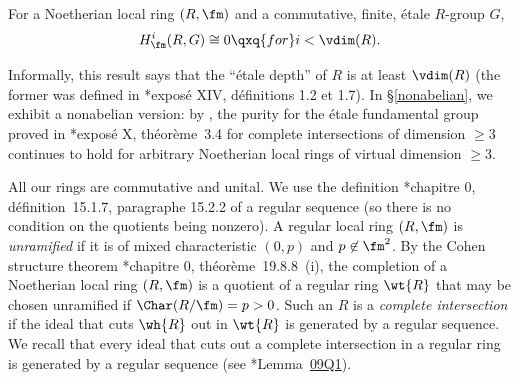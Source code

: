  \label{ell-semipurity-ann}
For a Noetherian local ring $(R, \fm)$ and a commutative, finite, \'{e}tale $R$-group $G$,
\[
H^i_\fm(R, G) \cong 0 \qxq{for} i < \vdim(R).
\]
\ethm


Informally, this result says that the ``\'{e}tale depth'' of $R$ is at least $\vdim(R)$ (the former was defined in \cite{SGA2new}*{expos\'{e} XIV, d\'{e}finitions 1.2 et 1.7}). In \S\ref{nonabelian}, we exhibit a nonabelian version: by , the purity for the \'{e}tale fundamental group proved in \cite{SGA2new}*{expos\'{e} X, th\'{e}or\`{e}me~3.4} for complete intersections of dimension $\ge 3$ continues to hold for arbitrary Noetherian local rings of virtual dimension $\ge 3$.















 \label{conv}
All our rings are commutative and unital. We use the definition \cite{EGAIV1}*{chapitre 0, d\'{e}finition~15.1.7, paragraphe 15.2.2} of a regular sequence (so there is no condition on the quotients being nonzero).	 A regular local ring $(R, \fm)$ is \emph{unramified} if it is of mixed characteristic $(0, p)$ and $p \not \in \fm^2$. By the Cohen structure theorem \cite{EGAIV1}*{chapitre 0, th\'{e}or\`{e}me~19.8.8~(i)}, the completion of a Noetherian local ring $(R, \fm)$ is a quotient of a regular ring $\wt{R}$ that may be chosen unramified if  $\Char(R/\fm) = p > 0$. Such an $R$ is a \emph{complete intersection} if the ideal that cuts $\wh{R}$ out in $\wt{R}$ is generated by a regular sequence. We recall that every ideal that cuts out a complete intersection in a regular ring is generated by a regular sequence (see \cite{SP}*{Lemma~\href{https://stacks.math.columbia.edu/tag/09Q1}{09Q1}}).  %


